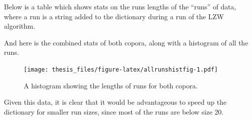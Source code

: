 \documentclass[12pt,twoside]{reedthesis}
\begin{document}
Below is a table which shows stats on the runs lengths of the ``runs'' of data, where a run is a string added to the dictionary during a run of the LZW algorithm.
\begin{table}[H]

\caption{\label{tab:runstatsfig}Run Lengths for Corpus 1}
\centering
{}
\end{table}
\begin{table}[H]

\caption{\label{tab:runstatsfig}Run Lengths for Corpus 2}
\centering
{}
\end{table}
And here is the combined stats of both copora, along with a histogram of all the runs.
\begin{table}[H]

\caption{\label{tab:bothrunsfig}Run lengths for both corpora}
\centering
{}
\end{table}
\begin{figure}
\centering
\texttt{[image: thesis\_files/figure-latex/allrunshistfig-1.pdf]}
\caption{\label{fig:allrunshistfig}A histogram showing the lengths of runs for both copora.}
\end{figure}
Given this data, it is clear that it would be advantageous to speed up the dictionary for smaller run sizes, since most of the runs are below size 20.
\end{document}
